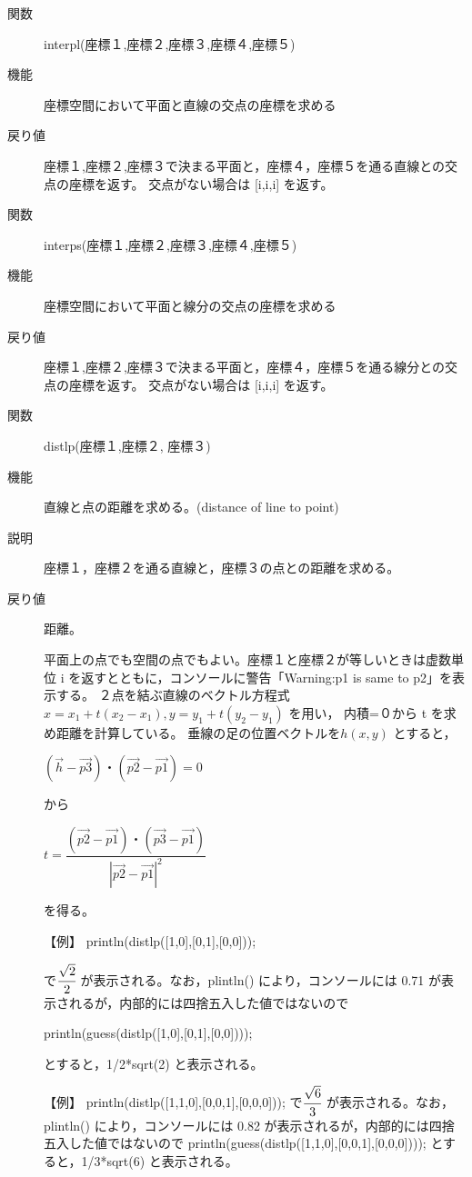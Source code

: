 \documentclass[papersize,a4paper,12pt,uplatex]{jsarticle}
\begin{document}
\begin{description}
\vspace{\baselineskip}
\hypertarget{interpl}{}
\item[関数] interpl(座標１,座標２,座標３,座標４,座標５)
\item[機能] 座標空間において平面と直線の交点の座標を求める
\item[戻り値] 座標１,座標２,座標３で決まる平面と，座標４，座標５を通る直線との交点の座標を返す。
 交点がない場合は [i,i,i] を返す。 
 
\vspace{\baselineskip}
\hypertarget{interps}{}
\item[関数] interps(座標１,座標２,座標３,座標４,座標５)
\item[機能] 座標空間において平面と線分の交点の座標を求める
\item[戻り値]  座標１,座標２,座標３で決まる平面と，座標４，座標５を通る線分との交点の座標を返す。 
交点がない場合は [i,i,i] を返す。


\hypertarget{distlp}{}
\item[関数] distlp(座標１,座標２, 座標３)
\item[機能] 直線と点の距離を求める。(distance of line to point)
\item[説明] 座標１，座標２を通る直線と，座標３の点との距離を求める。
\item[戻り値] 距離。

 平面上の点でも空間の点でもよい。座標１と座標２が等しいときは虚数単位 i を返すとともに，コンソールに警告「Warning:p1 is same to p2」を表示する。 
２点を結ぶ直線のベクトル方程式 $x=x_1+t(x_2-x_1) , y=y_1+t(y_2-y_1)$ を用い，
内積=０から t を求め距離を計算している。 
  垂線の足の位置ベクトルを$h(x,y)$ とすると， 
  
      $(\vec{h}-\vec{p3})・(\vec{p2}-\vec{p1})=0$ 
  
  から 
  
      $t=\dfrac{(\vec{p2}-\vec{p1})・(\vec{p3}-\vec{p1})}{|\vec{p2}-\vec{p1}|^2}$ 
  
  を得る。 

【例】 println(distlp([1,0],[0,1],[0,0])); 

で$\cfrac{\sqrt{2}}{2}$ が表示される。なお，plintln() により，コンソールには 0.71 が表示されるが，内部的には四捨五入した値ではないので 

   println(guess(distlp([1,0],[0,1],[0,0]))); 

とすると，1/2*sqrt(2) と表示される。 

【例】 println(distlp([1,1,0],[0,0,1],[0,0,0]));  で$\cfrac{\sqrt{6}}{3}$ が表示される。なお，plintln() により，コンソールには 0.82 が表示されるが，内部的には四捨五入した値ではないので 
   println(guess(distlp([1,1,0],[0,0,1],[0,0,0]))); 
とすると，1/3*sqrt(6) と表示される。 


\end{description}
\end{document}
